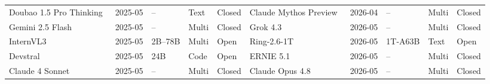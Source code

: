 \begin{table}[htbp]
{\begin{tabular}{@{} lllll | lllll @{}}
Doubao 1.5 Pro Thinking~\cite{bytedance2025doubao15thinking} & 2025-05 & -- & Text & Closed & Claude Mythos Preview~\cite{anthropic2026claudemythospreview} & 2026-04 & -- & Multi & Closed \\
Gemini 2.5 Flash~\cite{google2025gemini25io} & 2025-05 & -- & Multi & Closed & Grok 4.3~\cite{xai2026grok43nonreasoning} & 2026-05 & -- & Multi & Closed \\
InternVL3~\cite{zhu2025internvl3} & 2025-05 & 2B--78B & Multi & Open & Ring-2.6-1T~\cite{inclusionai2026ring26} & 2026-05 & 1T-A63B & Text & Open \\
Devstral~\cite{mistral2025devstral} & 2025-05 & 24B & Code & Open & ERNIE 5.1~\cite{baidu2026ernie51} & 2026-05 & -- & Multi & Closed \\
Claude 4 Sonnet~\cite{anthropic2025claude4systemcard} & 2025-05 & -- & Multi & Closed & Claude Opus 4.8~\cite{anthropic2026claudeopus48} & 2026-05 & -- & Multi & Closed \\
\bottomrule
\end{tabular}
}
\end{table}
